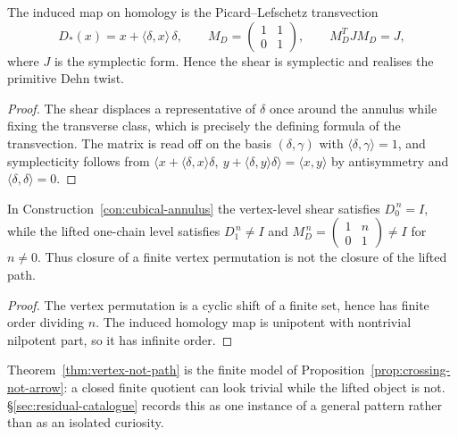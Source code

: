 \begin{proposition}\label{prop:shear-transvection}
The induced map on homology is the Picard--Lefschetz transvection
\[
  D_\ast(x)=x+\langle \delta,x\rangle\,\delta ,\qquad
  M_D=\begin{pmatrix}1&1\\ 0&1\end{pmatrix},\qquad
  M_D^{T}JM_D=J ,
\]
where $J$ is the symplectic form.  Hence the shear is symplectic and realises the
primitive Dehn twist.
\end{proposition}

\begin{proof}
The shear displaces a representative of $\delta$ once around the annulus while fixing
the transverse class, which is precisely the defining formula of the transvection.  The
matrix is read off on the basis $(\delta,\gamma)$ with
$\langle\delta,\gamma\rangle=1$, and symplecticity follows from
$\langle x+\langle\delta,x\rangle\delta,\ y+\langle\delta,y\rangle\delta\rangle
=\langle x,y\rangle$ by antisymmetry and $\langle\delta,\delta\rangle=0$.
\end{proof}

\begin{theorem}
\label{thm:vertex-not-path}
In Construction~\ref{con:cubical-annulus} the vertex-level shear satisfies $D_0^{\,n}=I$,
while the lifted one-chain level satisfies $D_1^{\,n}\neq I$ and
$M_D^{\,n}=\begin{pmatrix}1&n\\ 0&1\end{pmatrix}\neq I$ for $n\neq0$.  Thus closure of a
finite vertex permutation is not the closure of the lifted path.
\end{theorem}

\begin{proof}
The vertex permutation is a cyclic shift of a finite set, hence has finite order dividing
$n$.  The induced homology map is unipotent with nontrivial nilpotent part, so it has
infinite order.
\end{proof}

\begin{remark}
Theorem~\ref{thm:vertex-not-path} is the finite model of
Proposition~\ref{prop:crossing-not-arrow}: a closed finite quotient can look trivial
while the lifted object is not.  \S\ref{sec:residual-catalogue} records this as one
instance of a general pattern rather than as an isolated curiosity.
\end{remark}

